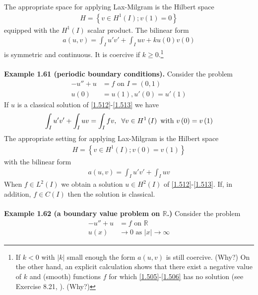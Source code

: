\documentclass[a4paper,oneside]{article}
\numberwithin{equation}{section}
\begin{document}
The appropriate space for applying Lax-Milgram is the Hilbert space
\begin{align}
H = \left\{ {v \in {H^1}\left( I \right);v\left( 1 \right) = 0} \right\}
\end{align}
equipped with the $H^1\left(I\right)$ scalar product. The bilinear form
\begin{align}
a\left( {u,v} \right) = \int_I {u'v'}  + \int_I {uv}  + ku\left( 0 \right)v\left( 0 \right)
\end{align}
is symmetric and continuous. It is coercive if $k\ge 0$.\footnote{If $k<0$ with $\left| k \right|$ small enough the form $a\left(u,v\right)$ is still coercive. (Why?) On the other hand, an explicit calculation shows that there exist a negative value of $k$ and (smooth) functions $f$ for which \eqref{1.505}-\eqref{1.506} has no solution (see Exercise 8.21, \cite{1}). (Why?)}\\
\\
\textbf{Example 1.61 (periodic boundary conditions).} Consider the problem
\begin{align}
\label{1.512}
 - u'' + u &= f\mbox{ on } I = \left( {0,1} \right)\\
u\left( 0 \right) &= u\left( 1 \right),u'\left( 0 \right) = u'\left( 1 \right) \label{1.513}
\end{align}
If $u$ is a classical solution of \eqref{1.512}-\eqref{1.513} we have
\begin{align}
\int_I {u'v'}  + \int_I {uv}  = \int_I {fv} ,\hspace{0.2cm}\forall v \in {H^1}\left( I \right)\mbox{ with } v\left( 0 \right) = v\left( 1 \right)
\end{align}
The appropriate setting for applying Lax-Milgram is the Hilbert space
\begin{align}
H = \left\{ {v \in {H^1}\left( I \right);v\left( 0 \right) = v\left( 1 \right)} \right\}
\end{align}
with the bilinear form
\begin{align}
a\left( {u,v} \right) = \int_I {u'v'}  + \int_I {uv} 
\end{align}
When $f\in L^2\left(I\right)$ we obtain a solution $u\in H^2\left(I\right)$ of \eqref{1.512}-\eqref{1.513}. If, in addition, $f\in C\left(I\right)$ then the solution is classical.\\
\\
\textbf{Example 1.62 (a boundary value problem on $\mathbb{R}$.)} Consider the problem
\begin{align}
\label{1.517}
 - u'' + u &= f\mbox{ on } \mathbb{R}\\
u\left( x \right) &\to 0\mbox{ as } \left| x \right| \to \infty \label{1.518}
\end{align}
\end{document}
